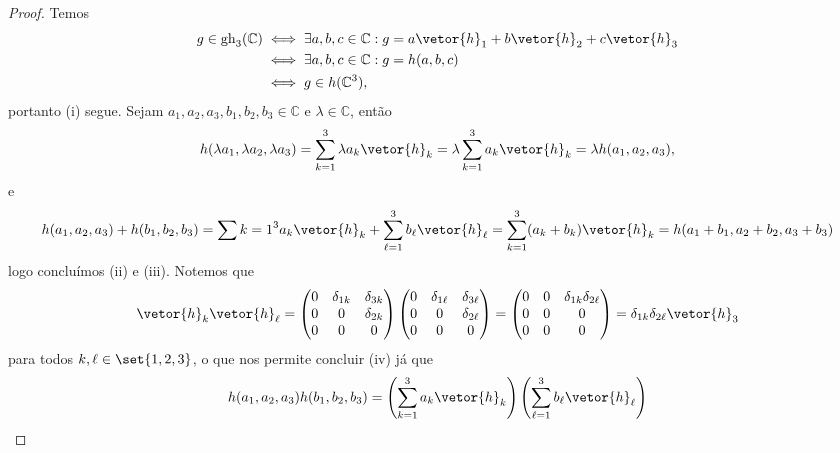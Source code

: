 \begin{proof}
    Temos
    \begin{align*}
        g \in \mathrm{gh}_3(\mathbb{C}) &\iff \exists a,b,c \in \mathbb{C}: g = a\vetor{h}_1 + b\vetor{h}_2 + c \vetor{h}_3  \\
                                        &\iff \exists a,b,c \in \mathbb{C} : g = h(a,b,c)\\
                                        &\iff g \in h(\mathbb{C}^3),
    \end{align*}
    portanto (i) segue. Sejam \(a_1,a_2,a_3,b_1,b_2,b_3 \in \mathbb{C}\) e \(\lambda \in \mathbb{C}\), então
    \begin{equation*}
        h(\lambda a_1, \lambda a_2, \lambda a_3) = \sum_{k=1}^3 \lambda a_k \vetor{h}_k = \lambda \sum_{k = 1}^3 a_k \vetor{h}_k = \lambda h(a_1, a_2, a_3),
    \end{equation*}
    e
    \begin{equation*}
        h(a_1, a_2, a_3) + h(b_1,b_2,b_3) = \sum{k = 1}^3 a_k \vetor{h}_k + \sum_{\ell = 1}^3 b_\ell \vetor{h}_\ell = \sum_{k = 1}^3 (a_k + b_k)\vetor{h}_k = h(a_1 + b_1, a_2 + b_2, a_3 + b_3)
    \end{equation*}
    logo concluímos (ii) e (iii). Notemos que
    \begin{equation*}
        \vetor{h}_k \vetor{h}_\ell = \begin{pmatrix}
            0 & \delta_{1k} & \delta_{3k}\\
            0 & 0 & \delta_{2k}\\
            0 & 0 & 0
        \end{pmatrix}
        \begin{pmatrix}
            0 & \delta_{1\ell} & \delta_{3\ell}\\
            0 & 0 & \delta_{2 \ell}\\
            0 & 0 & 0
        \end{pmatrix} =
        \begin{pmatrix}
            0 & 0 & \delta_{1k} \delta_{2\ell}\\
            0 & 0 & 0\\
            0 & 0 & 0
        \end{pmatrix} = \delta_{1k} \delta_{2\ell} \vetor{h}_3
    \end{equation*}
    para todos \(k, \ell \in \set{1,2,3}\), o que nos permite concluir (iv) já que
    \begin{align*}
        h(a_1,a_2,a_3) h(b_1,b_2,b_3) &= \left(\sum_{k = 1}^3 a_k \vetor{h}_k\right)\left(\sum_{\ell = 1}^3 b_\ell \vetor{h}_\ell\right)\\

\end{align*}
\end{proof}
